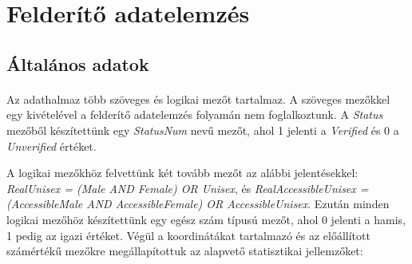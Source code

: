 	\section{Felderítő adatelemzés}
	\subsection{Általános adatok}
	\paragraph{}
	Az adathalmaz több szöveges és logikai mezőt tartalmaz. A szöveges mezőkkel egy kivételével a felderítő adatelemzés folyamán nem foglalkoztunk. A \textit{Status} mezőből készítettünk egy \textit{StatusNum} nevű mezőt, ahol 1 jelenti a \textit{Verified} és 0 a \textit{Unverified} értéket. \par
	A logikai mezőkhöz felvettünk két tovább mezőt az alábbi jelentésekkel: \textit{RealUnisex = (Male AND Female) OR Unisex}, és \textit{RealAccessibleUnisex = (AccessibleMale AND AccessibleFemale) OR AccessibleUnisex}. Ezután minden logikai mezőhöz készítettünk egy egész szám típusú mezőt, ahol 0 jelenti a hamis, 1 pedig az igazi értéket. Végül a koordinátákat tartalmazó és az előállított számértékű mezőkre megállapítottuk az alapvető statisztikai jellemzőket:
